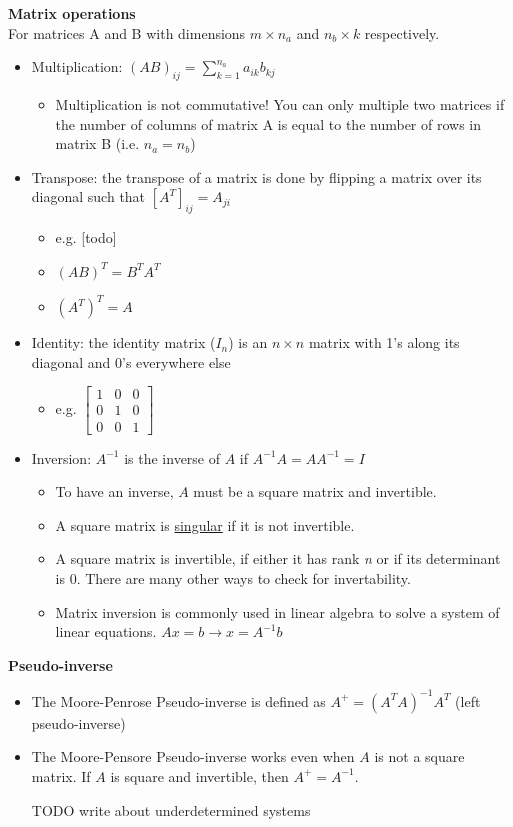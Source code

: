 \documentclass[../main.tex]{subfiles}
\begin{document}
  \textbf{Matrix operations} \\
  For matrices A and B with dimensions $m \times n_{a}$ and $n_{b} \times k$ respectively.
  \begin{itemize}
      \item Multiplication: $(AB)_{ij} = \sum_{k=1}^{n_{a}} a_{ik} b_{kj}$
      \begin{itemize}
          \item Multiplication is not commutative! You can only multiple two matrices if the number of columns of matrix A is equal to the number of rows in matrix B (i.e. $n_{a} = n_{b}$)
      \end{itemize}
      \item Transpose: the transpose of a matrix is done by flipping a matrix over its diagonal such that $[A^{T}]_{ij} = A_{ji}$
      \begin{itemize}
          \item e.g. [todo]
          \item $(AB)^{T} = B^{T}A^{T}$
          \item $(A^{T})^{T} = A$
      \end{itemize}
      \item Identity: the identity matrix ($I_{n}$) is an $n \times n$ matrix with 1's along its diagonal and 0's everywhere else
      \begin{itemize}
          \item e.g. $\begin{bmatrix} 1&0&0 \\ 0&1&0 \\ 0&0&1 \end{bmatrix}$
      \end{itemize}
      \item Inversion: $A^{-1}$ is the inverse of $A$ if $A^{-1}A = AA^{-1} = I$
      \begin{itemize}
          \item To have an inverse, $A$ must be a square matrix and invertible.
          \item A square matrix is \underline{singular} if it is not invertible.
          \item A square matrix is invertible, if either it has rank \textit{n} or if its determinant is 0. There are many other ways to check for invertability.
          \item Matrix inversion is commonly used in linear algebra to solve a system of linear equations. $Ax = b \rightarrow x = A^{-1}b$
      \end{itemize}
  \end{itemize}

  \textbf{Pseudo-inverse}
  \begin{itemize}
      \item The Moore-Penrose Pseudo-inverse is defined as $A^{+} = (A^{T}A)^{-1}A^{T}$ (left pseudo-inverse)
      \item The Moore-Pensore Pseudo-inverse works even when $A$ is not a square matrix. If $A$ is square and invertible, then $A^{+} = A^{-1}$.
      \item [TODO] write about underdetermined systems
  \end{itemize}
\end{document}
